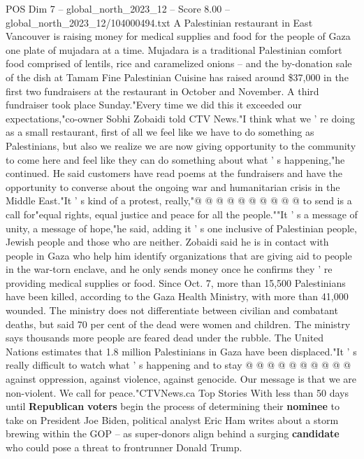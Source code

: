 \begin{textsample}{POS Dim 7 – global\_north\_2023\_12 – Score 8.00 – global\_north\_2023\_12/104000494.txt}  \label{ex:f7_pos_155}
A Palestinian restaurant in East Vancouver is raising money for medical supplies and food for the people of Gaza one plate of mujadara at a time.
Mujadara is a traditional Palestinian comfort food comprised of lentils, rice and caramelized onions -- and the by-donation sale of the dish at Tamam Fine Palestinian Cuisine has raised around \$37,000 in the first two fundraisers at the restaurant in October and November.
A third fundraiser took place Sunday."Every time we did this it exceeded our expectations,"co-owner Sobhi Zobaidi told CTV News."I think what we ' re doing as a small restaurant, first of all we feel like we have to do something as Palestinians, but also we realize we are now giving opportunity to the community to come here and feel like they can do something about what ' s happening,"he continued.
He said customers have read poems at the fundraisers and have the opportunity to converse about the ongoing war and humanitarian crisis in the Middle East."It ' s kind of a protest, really,"@ @ @ @ @ @ @ @ @ @ to send is a call for"equal rights, equal justice and peace for all the people.""It ' s a message of unity, a message of hope,"he said, adding it ' s one inclusive of Palestinian people, Jewish people and those who are neither.
Zobaidi said he is in contact with people in Gaza who help him identify organizations that are giving aid to people in the war-torn enclave, and he only sends money once he confirms they ' re providing medical supplies or food.
Since Oct. 7, more than 15,500 Palestinians have been killed, according to the Gaza Health Ministry, with more than 41,000 wounded.
The ministry does not differentiate between civilian and combatant deaths, but said 70 per cent of the dead were women and children.
The ministry says thousands more people are feared dead under the rubble.
The United Nations estimates that 1.8 million Palestinians in Gaza have been displaced."It ' s really difficult to watch what ' s happening and to stay @ @ @ @ @ @ @ @ @ @ against oppression, against violence, against genocide.
Our message is that we are non-violent.
We call for peace."CTVNews.ca Top Stories With less than 50 days until \textbf{Republican} \textbf{voters} begin the process of determining their \textbf{nominee} to take on President Joe Biden, political analyst Eric Ham writes about a storm brewing within the GOP -- as super-donors align behind a surging \textbf{candidate} who could pose a threat to frontrunner Donald Trump.

\end{textsample}
